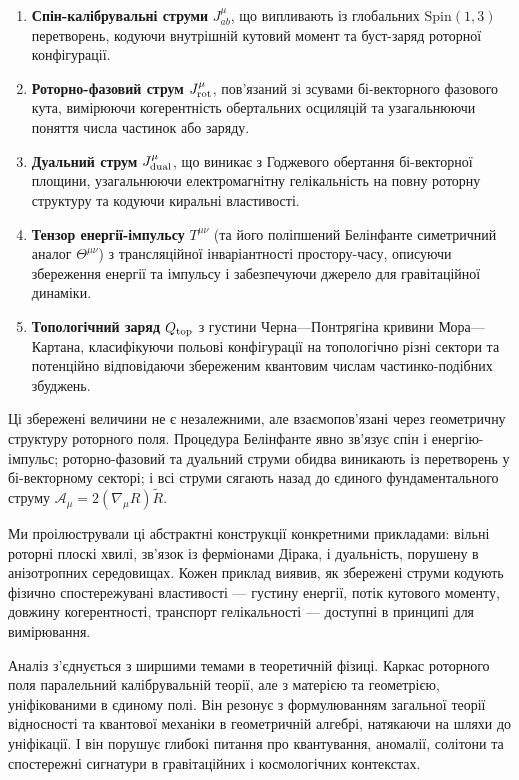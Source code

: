 \documentclass[11pt,a4paper]{article}
\numberwithin{equation}{section}
\theoremstyle{plain}
\theoremstyle{definition}
\theoremstyle{remark}
\begin{document}
\begin{enumerate}
  \item \textbf{Спін-калібрувальні струми} $J^\mu_{ab}$, що випливають із глобальних $\mathrm{Spin}(1,3)$ перетворень, кодуючи внутрішній кутовий момент та буст-заряд роторної конфігурації.

  \item \textbf{Роторно-фазовий струм} $J^\mu_{\rm rot}$, пов'язаний зі зсувами бі-векторного фазового кута, вимірюючи когерентність обертальних осциляцій та узагальнюючи поняття числа частинок або заряду.

  \item \textbf{Дуальний струм} $J^\mu_{\rm dual}$, що виникає з Годжевого обертання бі-векторної площини, узагальнюючи електромагнітну гелікальність на повну роторну структуру та кодуючи киральні властивості.

  \item \textbf{Тензор енергії-імпульсу} $T^{\mu\nu}$ (та його поліпшений Белінфанте симетричний аналог $\Theta^{\mu\nu}$) з трансляційної інваріантності простору-часу, описуючи збереження енергії та імпульсу і забезпечуючи джерело для гравітаційної динаміки.

  \item \textbf{Топологічний заряд} $Q_{\rm top}$ з густини Черна—Понтрягіна кривини Мора—Картана, класифікуючи польові конфігурації на топологічно різні сектори та потенційно відповідаючи збереженим квантовим числам частинко-подібних збуджень.
\end{enumerate}

Ці збережені величини не є незалежними, але взаємопов'язані через геометричну структуру роторного поля. Процедура Белінфанте явно зв'язує спін і енергію-імпульс; роторно-фазовий та дуальний струми обидва виникають із перетворень у бі-векторному секторі; і всі струми сягають назад до єдиного фундаментального струму $\mathcal{A}_\mu = 2(\nabla_\mu R)\widetilde{R}$.

Ми проілюстрували ці абстрактні конструкції конкретними прикладами: вільні роторні плоскі хвилі, зв'язок із ферміонами Дірака, і дуальність, порушену в анізотропних середовищах. Кожен приклад виявив, як збережені струми кодують фізично спостережувані властивості — густину енергії, потік кутового моменту, довжину когерентності, транспорт гелікальності — доступні в принципі для вимірювання.

Аналіз з'єднується з ширшими темами в теоретичній фізиці. Каркас роторного поля паралельний калібрувальній теорії, але з матерією та геометрією, уніфікованими в єдиному полі. Він резонує з формулюванням загальної теорії відносності та квантової механіки в геометричній алгебрі, натякаючи на шляхи до уніфікації. І він порушує глибокі питання про квантування, аномалії, солітони та спостережні сигнатури в гравітаційних і космологічних контекстах.
\end{document}
